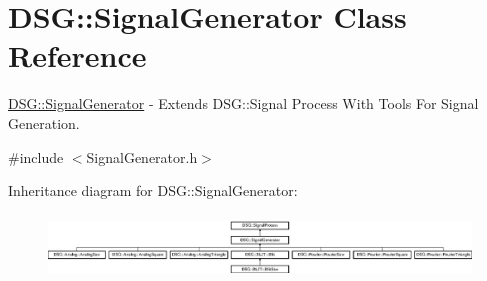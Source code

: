 \hypertarget{class_d_s_g_1_1_signal_generator}{\section{D\+S\+G\+:\+:Signal\+Generator Class Reference}
\label{class_d_s_g_1_1_signal_generator}
}


\hyperlink{class_d_s_g_1_1_signal_generator}{D\+S\+G\+::\+Signal\+Generator} -\/ Extends D\+S\+G\+::\+Signal Process With Tools For Signal Generation.  




{\ttfamily \#include $<$Signal\+Generator.\+h$>$}

Inheritance diagram for D\+S\+G\+:\+:Signal\+Generator\+:\begin{figure}[H]
\begin{center}
\leavevmode
\includegraphics[height=1.702128cm]{class_d_s_g_1_1_signal_generator}
\end{center}
\end{figure}
